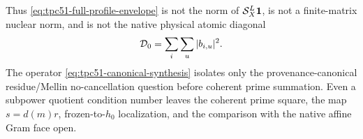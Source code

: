 Thus \eqref{eq:tpc51-full-profile-envelope} is not the norm of
$\mathcal S_X^L\mathbf 1$, is not a finite-matrix nuclear norm, and is not the native
physical atomic diagonal
\begin{equation}
 \mathcal D_0=\sum_i\sum_u|b_{i,u}|^2.
 \label{eq:tpc51-native-atomic-diagonal}
\end{equation}
The operator \eqref{eq:tpc51-canonical-synthesis} isolates only the
provenance-canonical residue/Mellin no-cancellation question before coherent
prime summation.  Even a subpower quotient condition number leaves the
coherent prime square, the map $s=d(m)r$, frozen-to-$h_0$ localization, and
the comparison with the native affine Gram face open.
